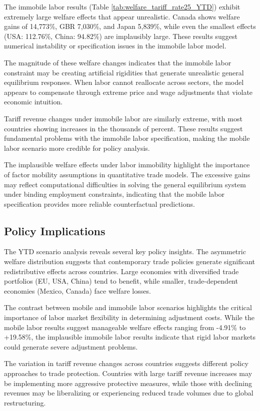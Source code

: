 The immobile labor results (Table \ref{tab:welfare_tariff_rate25_YTD}) exhibit extremely large welfare effects that appear unrealistic. Canada shows welfare gains of 14,773\%, GBR 7,030\%, and Japan 5,839\%, while even the smallest effects (USA: 112.76\%, China: 94.82\%) are implausibly large. These results suggest numerical instability or specification issues in the immobile labor model.

The magnitude of these welfare changes indicates that the immobile labor constraint may be creating artificial rigidities that generate unrealistic general equilibrium responses. When labor cannot reallocate across sectors, the model appears to compensate through extreme price and wage adjustments that violate economic intuition.

Tariff revenue changes under immobile labor are similarly extreme, with most countries showing increases in the thousands of percent. These results suggest fundamental problems with the immobile labor specification, making the mobile labor scenario more credible for policy analysis.

The implausible welfare effects under labor immobility highlight the importance of factor mobility assumptions in quantitative trade models. The excessive gains may reflect computational difficulties in solving the general equilibrium system under binding employment constraints, indicating that the mobile labor specification provides more reliable counterfactual predictions.

\subsection{Policy Implications}

The YTD scenario analysis reveals several key policy insights. The asymmetric welfare distribution suggests that contemporary trade policies generate significant redistributive effects across countries. Large economies with diversified trade portfolios (EU, USA, China) tend to benefit, while smaller, trade-dependent economies (Mexico, Canada) face welfare losses.

The contrast between mobile and immobile labor scenarios highlights the critical importance of labor market flexibility in determining adjustment costs. While the mobile labor results suggest manageable welfare effects ranging from -4.91\% to +19.58\%, the implausible immobile labor results indicate that rigid labor markets could generate severe adjustment problems.

The variation in tariff revenue changes across countries suggests different policy approaches to trade protection. Countries with large tariff revenue increases may be implementing more aggressive protective measures, while those with declining revenues may be liberalizing or experiencing reduced trade volumes due to global restructuring.
